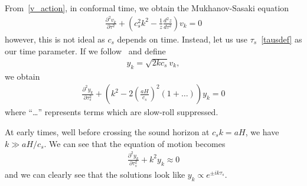     From~\eqref{v_action}, in conformal time, we obtain the Mukhanov-Sasaki equation
    \begin{align}\label{modefneqn_tau}
        \frac{\partial^2 v_k}{\partial \tau^2} + \left(c_s^2k^2 - \frac{1}{z}\frac{d^2 z}{d \tau^2}\right)v_k = 0
    \end{align}
    however, this is not ideal as $c_s$ depends on time.
    Instead, let us use $\tau_s$~\eqref{tausdef} as our time parameter.
    If we follow~\cite{Hu_2011} and define
    \begin{align}\label{y_defn}
        y_k=\sqrt{2kc_s}v_k,
    \end{align}
    we obtain
    \begin{align}\label{modefneqn_tau_s}
        \frac{\partial^2 y_k}{\partial \tau_s^2} + \left(k^2 - 2\left(\frac{aH}{c_s}\right)^2(1+\ldots)\right)y_k = 0
    \end{align}
    where ``\ldots'' represents terms which are slow-roll suppressed.


    At early times, well before crossing the sound horizon at $c_sk=aH$,
    we have $k\gg aH/c_s$. We can see that the equation of motion becomes
    \begin{align}
        \frac{\partial^2 y_k}{\partial \tau_s^2} + k^2 y_k \approx 0
    \end{align}
    and we can clearly see that the solutions look like $y_k\propto e^{\pm ik\tau_s}$.


